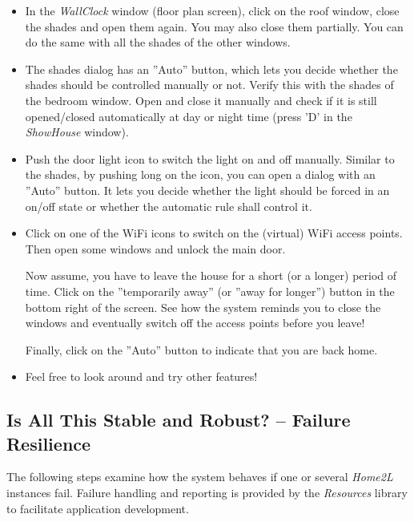 \documentclass[12pt,english,parskip=half,headheight=19pt]{scrreprt}
\begin{document}
\begin{itemize}[$\blacktriangleright$]

  \item
    In the \textit{WallClock} window (floor plan screen), click on the roof window, close
    the shades and open them again. You may also close them partially. You can do the same
    with all the shades of the other windows.

  \item
    The shades dialog has an ''Auto'' button, which lets you decide whether the shades should
    be controlled manually or not. Verify this with the shades of the bedroom window.
    Open and close it manually and check if it is still opened/closed automatically at
    day or night time (press 'D' in the \textit{ShowHouse} window).

  \item
    Push the door light icon to switch the light on and off manually. Similar to the shades,
    by pushing long on the icon, you can open a dialog with an ''Auto'' button. It lets
    you decide whether the light should be forced in an on/off state or whether the automatic
    rule shall control it.

  \item
    Click on one of the WiFi icons to switch on the (virtual) WiFi access points.
    Then open some windows and unlock the main door.

    Now assume, you have to leave the house for a short (or a longer) period of time.
    Click on the ''temporarily away'' (or ''away for longer'') button in the bottom right
    of the screen. See how the system reminds you to close the windows and eventually
    switch off the access points before you leave!

    Finally, click on the ''Auto'' button to indicate that you are back home.

  \item
    Feel free to look around and try other features!

\end{itemize}


\subsection{Is All This Stable and Robust? -- Failure Resilience}
\label{sec:tutorial-firststeps-robust}

The following steps examine how the system behaves if one or several \textit{Home2L} instances fail. Failure handling and reporting is provided by the \textit{Resources} library to facilitate application development.
\end{document}
